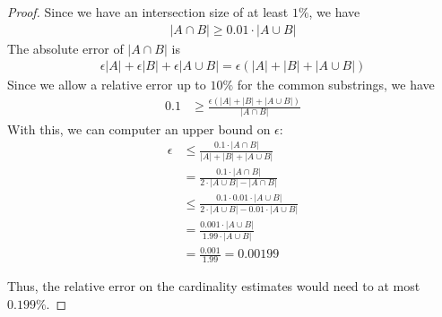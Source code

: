 \documentclass{article}
\begin{document}
\begin{enumerate}
    \begin{proof}
        Since we have an intersection size of at least $1\%$, we have
        \begin{align}
            |A \cap B| \ge 0.01 \cdot |A \cup B|
        \end{align}
        The absolute error of $|A \cap B|$ is
        \begin{align}
            \epsilon|A| + \epsilon|B| + \epsilon|A \cup B| = \epsilon(|A| + |B| + |A \cup B|)
        \end{align}
        Since we allow a relative error up to $10\%$ for the common substrings, we have
        \begin{align}
            0.1 &\ge \frac{\epsilon(|A| + |B| + |A \cup B|)}{|A \cap B|}
        \end{align}
        With this, we can computer an upper bound on $\epsilon$:
        \begin{align}
              \epsilon &\le \frac{0.1 \cdot |A \cap B|}{|A| + |B| + |A \cup B|}\\
              &= \frac{0.1 \cdot |A \cap B|}{2 \cdot |A \cup B| - |A \cap B|}\\
              &\le \frac{0.1 \cdot 0.01 \cdot |A \cup B|}{2 \cdot |A \cup B| - 0.01 \cdot |A \cup B|}\\
              &= \frac{0.001 \cdot |A \cup B|}{1.99 \cdot |A \cup B|}\\
              &= \frac{0.001}{1.99} = 0.00199
        \end{align}

        Thus, the relative error on the cardinality estimates would need to at most $0.199\%$.

    \end{proof}
\end{enumerate}
\end{document}
